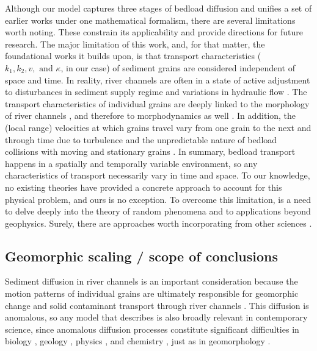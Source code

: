 \documentclass[]{agujournal2018}
\begin{document}
Although our model captures three stages of bedload diffusion and unifies a set of earlier works under one mathematical formalism, there are several limitations worth noting.
These constrain its applicability and provide directions for future research.
The major limitation of this work, and, for that matter, the foundational works it builds upon, is that transport characteristics ($k_1, k_2, v, \text{ and }\kappa$, in our case) of sediment grains are considered independent of space and time.
In reality, river channels are often in a state of active adjustment to disturbances in sediment supply regime and variations in hydraulic flow \citep{Church2017}. 
The transport characteristics of individual grains are deeply linked to the morphology of river channels \citep{Hassan2017}, and therefore to morphodynamics as well \citep[e.g.][]{Dhont2018}.
In addition, the (local range) velocities at which grains travel vary from one grain to the next \citep{Fathel2015, Heyman2016} and through time \citep{Fan2014, Ancey2014a} due to turbulence \citep{Celik2014} and the unpredictable nature of bedload collisions with moving \citep{Lee2002} and stationary grains \citep{Gordon1972}.
In summary, bedload transport happens in a spatially and temporally variable environment, so any characteristics of transport necessarily vary in time and space.
To our knowledge, no existing theories have provided a concrete approach to account for this physical problem, and ours is no exception.
To overcome this limitation, is a need to delve deeply into the theory of random phenomena and to applications beyond geophysics.
Surely, there are approaches worth incorporating from other sciences \citep[e.g.][]{Kutner2017}.

\subsection{Geomorphic scaling / scope of conclusions}
Sediment diffusion in river channels is an important consideration because the motion patterns of individual grains are ultimately responsible for geomorphic change \citep{Hassan2017} and solid contaminant transport through river channels \citep{Malmon2005, Macklin2006}.
This diffusion is anomalous, so any model that describes is also broadly relevant in contemporary science, since anomalous diffusion processes constitute significant difficulties in biology \citep[e.g.][]{Sokolov2012}, geology \citep[e.g.][]{Berkowitz2006}, physics \citep[e.g.][]{Metzler2000}, and chemistry \citep[e.g.][]{Metzler2014}, just as in geomorphology \citep[e.g.][]{Voller2010}.
\end{document}
